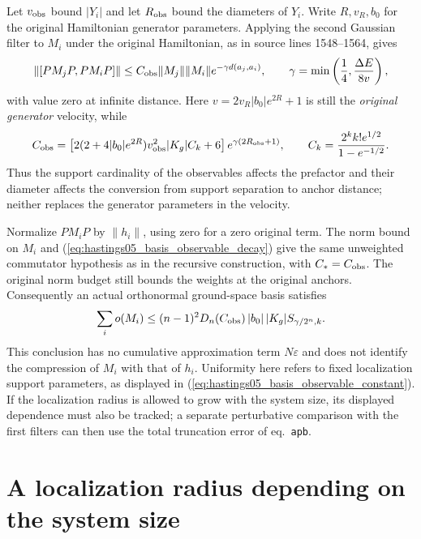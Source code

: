 \documentclass{article}
\begin{document}
Let $v_{\rm obs}$ bound $|Y_i|$ and let $R_{\rm obs}$ bound the diameters of
$Y_i$. Write $R,v_R,b_0$ for the original Hamiltonian generator parameters.
Applying the second Gaussian filter to $M_i$ under the original Hamiltonian,
as in source lines 1548--1564, gives
\begin{align}
 \|[PM_jP,PM_iP]\|
 \le C_{\rm obs}\|M_j\|\|M_i\|e^{-\gamma d(a_j,a_i)},
 \qquad \gamma=\min\left(\frac14,\frac{\Delta E}{8v}\right),
 \label{eq:hastings05_basis_observable_decay}
\end{align}
with value zero at infinite distance. Here $v=2v_R|b_0|e^{2R}+1$ is still the
\emph{original generator} velocity, while
\begin{align}
 C_{\rm obs}
 =\left[2(2+4|b_0|e^{2R})v_{\rm obs}^2|K_g|C_k+6\right]
 e^{\gamma(2R_{\rm obs}+1)},
 \qquad C_k=\frac{2^k k!e^{1/2}}{1-e^{-1/2}}.
 \label{eq:hastings05_basis_observable_constant}
\end{align}
Thus the support cardinality of the observables affects the prefactor and their
diameter affects the conversion from support separation to anchor distance;
neither replaces the generator parameters in the velocity.

Normalize $PM_iP$ by $\|h_i\|$, using zero for a zero original term. The norm
bound on $M_i$ and (\ref{eq:hastings05_basis_observable_decay}) give the same
unweighted commutator hypothesis as in the recursive construction, with
$C_*=C_{\rm obs}$. The original norm budget still bounds the weights at the
original anchors. Consequently an actual orthonormal ground-space basis satisfies
\begin{align}
 \sum_i o(M_i)\le(n-1)^2D_n(C_{\rm obs})\,|b_0|\,|K_g|S_{\gamma/2^n,k}.
 \label{eq:hastings05_basis_actual_truncated_sum}
\end{align}
This conclusion has no cumulative approximation term $N\varepsilon$ and does
not identify the compression of $M_i$ with that of $h_i$. Uniformity here refers
to fixed localization support parameters, as displayed in
(\ref{eq:hastings05_basis_observable_constant}). If the localization radius is
allowed to grow with the system size, its displayed dependence must also be
tracked; a separate perturbative comparison with the first filters can then use
the total truncation error of eq.~\texttt{apb}.

\section{A localization radius depending on the system size}
\end{document}
